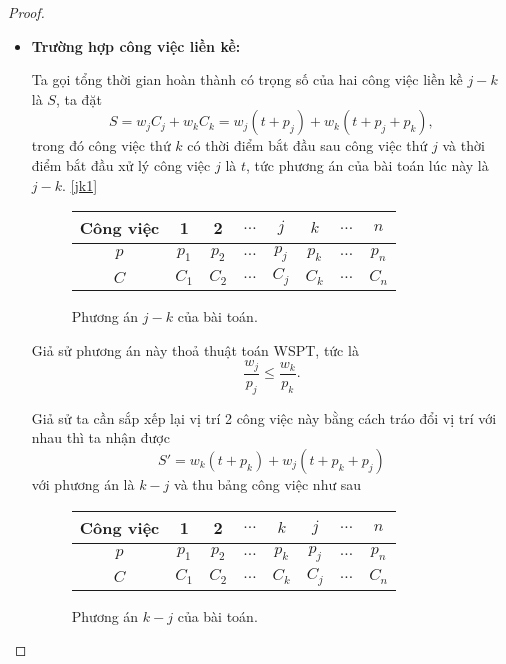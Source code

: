 \documentclass[12pt,a4paper]{report}
\begin{document}
\begin{proof}

\phantom{text}

\begin{itemize}
\item \textbf{Trường hợp công việc liền kề:}

	Ta gọi tổng thời gian hoàn thành có trọng số của hai công việc liền kề $j-k$ là $S$, ta đặt
	\begin{equation} \label{S}
		S = w_j C_j + w_k C_k = w_j(t+p_j) + w_k(t+p_j+p_k),
	\end{equation}
	trong đó công việc thứ $k$ có thời điểm bắt đầu sau công việc thứ $j$ và thời điểm bắt đầu xử lý công việc $j$ là $t$, tức phương án của bài toán lúc này là $j - k$. \eqref{jk1}
	
	\begin{figure}[h!]
		\centering
		 \begin{tabular}{|c | c c c c c c c |} 
		 \hline
		 Công việc & 1 & 2 & $\ldots$ & $j$ & $k$ & $\ldots$ & $n$ \\
		 \hline\hline
		 $p$ & $p_1$ & $p_2$ & $\ldots$ & $p_j$ & $p_k$ & $\ldots$ & $p_n$ \\
		 $C$ & $C_1$ & $C_2$ & $\ldots$ & $C_j$ & $C_k$ & $\ldots$ & $C_n$ \\
		 \hline
		 \end{tabular}
	\caption{\label{jk1}Phương án $j - k$ của bài toán.}
	\end{figure}
	
	Giả sử phương án này thoả thuật toán WSPT, tức là
	\begin{equation}
	\frac{w_j}{p_j} \leq \frac{w_k}{p_k}.
	\end{equation}
	
	Giả sử ta cần sắp xếp lại vị trí 2 công việc này bằng cách tráo đổi vị trí với nhau thì ta nhận được
	\begin{equation} \label{S'}
		S' = w_k(t+p_k) + w_j(t+p_k+p_j)
	\end{equation}
	với phương án là $k-j$ và thu bảng công việc như sau
	
	\begin{figure}[h!]
		\centering
		 \begin{tabular}{|c | c c c c c c c |} 
		 \hline
		 Công việc & 1 & 2 & $\ldots$ & $k$ & $j$ & $\ldots$ & $n$ \\
		 \hline\hline
		 $p$ & $p_1$ & $p_2$ & $\ldots$ & $p_k$ & $p_j$ & $\ldots$ & $p_n$ \\
		 $C$ & $C_1$ & $C_2$ & $\ldots$ & $C_k$ & $C_j$ & $\ldots$ & $C_n$ \\
		 \hline
		 \end{tabular}
	\caption{Phương án $k - j$ của bài toán.}
	\end{figure}


\end{itemize}
\end{proof}
\end{document}
